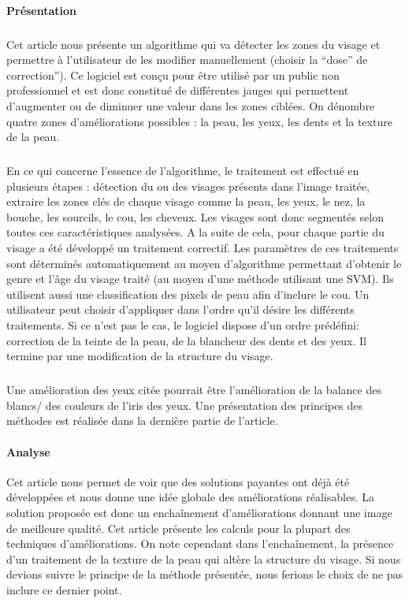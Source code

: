 \documentclass[11pt, french]{report-rd-info}
\begin{document}
\paragraph{Présentation}
\subparagraph{}
Cet article nous présente un algorithme qui va détecter les zones du visage et permettre à l'utilisateur de les modifier manuellement (choisir la “dose” de correction”). Ce logiciel est conçu pour être utilisé par un public non professionnel et est donc constitué de différentes jauges qui permettent d'augmenter ou de diminuer une valeur dans les zones ciblées. On dénombre quatre zones d'améliorations possibles : la peau, les yeux, les dents et la texture de la peau.
\subparagraph{}
En ce qui concerne l’essence de l’algorithme, le traitement est effectué en plusieurs étapes : détection du ou des visages présents dans l’image traitée, extraire les zones clés de chaque visage comme la peau, les yeux, le nez, la bouche, les sourcils, le cou, les cheveux. Les visages sont donc segmentés selon toutes ces caractéristiques analysées. A la suite de cela, pour chaque partie du visage a été développé un traitement correctif. Les paramètres de ces traitements sont déterminés automatiquement au moyen d’algorithme permettant d’obtenir le genre et l’âge du visage traité (au moyen d’une méthode utilisant une SVM). Ils utilisent aussi une classification des pixels de peau afin d’inclure le cou.
Un utilisateur peut choisir d’appliquer dans l’ordre qu’il désire les différents traitements. Si ce n’est pas le cas, le logiciel dispose d’un ordre prédéfini: correction de la teinte de la peau, de la blancheur des dents et des yeux. Il termine par une modification de la structure du visage.
\subparagraph{}
Une amélioration des yeux citée pourrait être l’amélioration de la balance des blancs/ des couleurs de l’iris des yeux. Une présentation des principes des méthodes est réalisée dans la dernière partie de l’article.

\paragraph{Analyse}
Cet article nous permet de voir que des solutions payantes ont déjà été développées et nous donne une idée globale des améliorations réalisables. La solution proposée est donc un enchaînement d’améliorations donnant une image de meilleure qualité. Cet article présente les calculs pour la plupart des techniques d’améliorations. On note cependant dans l'enchaînement, la présence d’un traitement de la texture de la peau qui altère la structure du visage. Si nous devions suivre le principe de la méthode présentée, nous ferions le choix de ne pas inclure ce dernier point.
\end{document}
